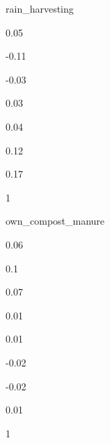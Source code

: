 \documentclass[
]{article}
\begin{document}
{ }

{ }

{ }

{ }

{ }

{ }

{ }

{ }

{ }

{ }

{ }

{ }

{ }

{ }

{ }

rain\_harvesting

{0.05 }

{-0.11}

{-0.03}

{0.03 }

{0.04 }

{0.12 }

{0.17 }

{1 }

{ }

{ }

{ }

{ }

{ }

{ }

{ }

{ }

{ }

{ }

{ }

{ }

{ }

{ }

{ }

{ }

own\_compost\_manure

{0.06 }

{0.1 }

{0.07 }

{0.01 }

{0.01 }

{-0.02}

{-0.02}

{0.01 }

{1 }

{ }

{ }

{ }

{ }

{ }

{ }
\end{document}
